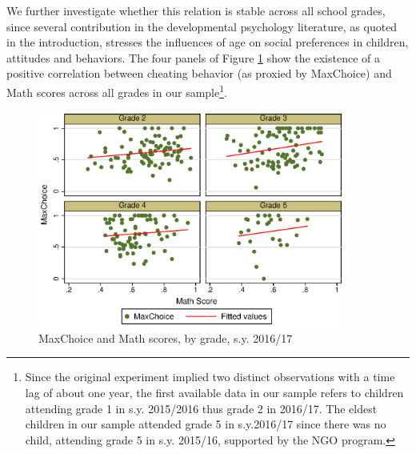\documentclass[authoryear, preprint, review, 12pt]{elsarticle}
\begin{document}
We further investigate whether this relation is stable across all school grades, since several contribution in the developmental psychology literature, as quoted in the introduction, stresses the influences of age on social preferences in children, attitudes and behaviors.
The four panels of Figure \ref{fig:summary2} show the existence of a positive correlation between cheating behavior (as proxied by MaxChoice) and Math scores across all grades in our sample\footnote{Since the original experiment implied two distinct observations with a time lag of about one year, the first available data in our sample refers to children attending grade 1 in s.y. 2015/2016 thus grade 2 in 2016/17. The eldest children in our sample attended grade 5 in s.y.2016/17 since there was no child, attending grade 5 in s.y. 2015/16, supported by the NGO program.}. 

\begin{figure}
	\centering
	\includegraphics[width=0.9\textwidth]{figures/maxchoice_and_math_byclass.eps}
	\caption{\label{fig:summary2}MaxChoice and Math scores, by grade, s.y. 2016/17}
\end{figure}
\end{document}
